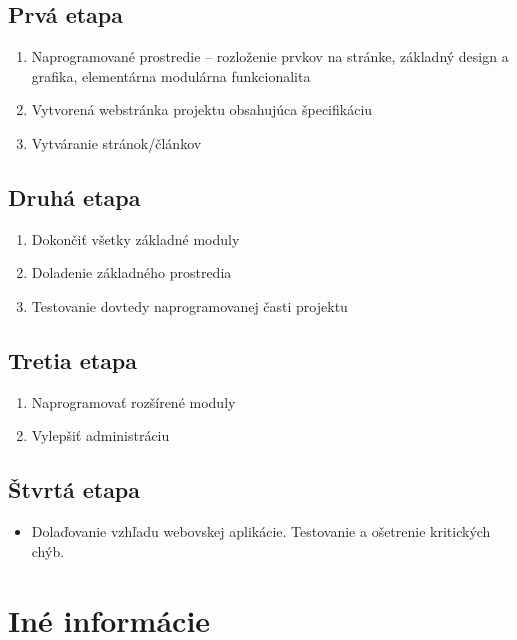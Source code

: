 \documentclass[a4paper,titlepage,11pt]{article}
\begin{document}
\subsection{Prvá etapa}
\begin{enumerate}
 \item Naprogramované prostredie -- rozloženie prvkov na stránke, základný design a grafika, elementárna modulárna funkcionalita
 \item Vytvorená webstránka projektu obsahujúca špecifikáciu 
 \item Vytváranie stránok\slash článkov
\end{enumerate}

\subsection{Druhá etapa}
\begin{enumerate}
 \item Dokončiť všetky základné moduly
 \item Doladenie základného prostredia
 \item Testovanie dovtedy naprogramovanej časti projektu
\end{enumerate}

\subsection{Tretia etapa}
\begin{enumerate}
 \item Naprogramovať rozšírené moduly
 \item Vylepšiť administráciu
\end{enumerate}

\subsection{Štvrtá etapa}
\begin{itemize}
 \item Dolaďovanie vzhľadu webovskej aplikácie. Testovanie a ošetrenie kritických chýb. 
\end{itemize}

\newpage
\section{Iné informácie}
\end{document}
